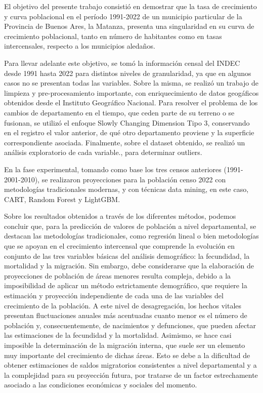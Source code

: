\documentclass{article}
\theoremstyle{mytheoremstyle}
\theoremstyle{mytheoremstyle}
\theoremstyle{myproblemstyle}
\begin{document}
El objetivo del presente trabajo consistió en demostrar que la tasa de crecimiento y curva poblacional en el período 1991-2022 de un municipio particular de la Provincia de Buenos Ares, la Matanza, presenta una singularidad en su curva de crecimiento poblacional, tanto en número de habitantes como en tasas intercensales, respecto a los municipios aledaños.\newline

Para llevar adelante este objetivo, se tomó la información censal del INDEC desde 1991 hasta 2022 para distintos niveles de granularidad, ya que en algunos casos no se presentan todas las variables. Sobre la misma, se realizó un trabajo de 
limpieza y pre-procesamiento importante, con enriquecimiento de datos geogáficos obtenidos desde el Instituto Geográfico Nacional. Para resolver el problema de los cambios de departamento en el tiempo, que ceden parte de su terreno o se fusionan, 
se utilizó el enfoque Slowly Changing Dimension Tipo 3, conservando en el registro el valor anterior, de qué otro departamento proviene y la superficie correspondiente asociada. Finalmente, sobre el dataset obtenido, se realizó un análisis 
exploratorio de cada variable., para determinar outliers.\newline
 
En la fase experimental, tomando como base los tres censos anteriores (1991-2001-2010), se realizaron proyecciones para la población censo 2022 con metodologías tradicionales modernas, y con técnicas data mining, en este caso, CART, 
Random Forest  y LightGBM. \newline

Sobre los resultados obtenidos a través de los diferentes métodos, podemos concluir que, para la predicción de valores de población a nivel departamental, se destacan las metodologías tradicionales, como regresión lineal o bien metodologías que se apoyan en el crecimiento intercensal que comprende la evolución en conjunto de las tres variables básicas del análisis demográfico: la fecundidad, la mortalidad y la migración. Sin embargo, debe  considerarse que la elaboración de proyecciones de población de áreas menores resulta compleja, debido a la imposibilidad de aplicar un método estrictamente demográfico, que requiere la estimación y proyección independiente de cada una de las variables del crecimiento 
de la población. A este nivel de desagregación, los hechos vitales presentan fluctuaciones anuales más acentuadas cuanto menor es el número de población y, consecuentemente, de nacimientos y defunciones, que pueden afectar las estimaciones de la fecundidad y la mortalidad. Asimismo, se hace casi imposible la determinación de la migración interna, que suele ser un elemento muy importante del crecimiento de dichas áreas. Esto se debe a la dificultad de obtener estimaciones 
 de saldos migratorios consistentes a nivel departamental y a la complejidad para su proyección futura, por tratarse de un factor estrechamente asociado a las condiciones económicas y sociales del momento.\newline
\end{document}
